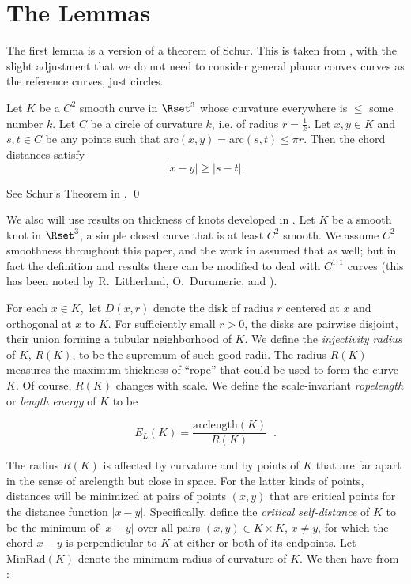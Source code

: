 \documentclass{elsart}
\begin{document}
\section{The Lemmas}
\label{thelemmas}

The first lemma is a version of a theorem of Schur.  This
is taken from \cite{Ch}, with the slight adjustment that
we do not need to consider general planar convex curves as
the reference curves, just circles.
 
\begin{lem}  Let $K$ be a $C^2$ smooth curve in $\Rset^3$
whose curvature everywhere is
$\leq$ some number $k$.  Let $C$ be a circle of curvature
$k$, i.e.{} of radius $r = {\frac1k}$.   Let $x,y \in K$ and $s,t
\in C$ 
be any points
such that $\mathrm{arc}(x,y)=\mathrm{arc}(s,t)
\leq \pi r$.  Then the chord distances satisfy $$|x-y|
\geq |s-t|.  $$
\label{schursthm}
\end{lem}

\begin{pf} See Schur's Theorem in \cite{Ch}.
\qed
\end{pf}

We also will use results on thickness of knots developed
in
\cite{LSDR}.  Let $K$ be a smooth knot in $\Rset^3$, a
simple closed curve that is at least $C^2$ smooth.  We
assume $C^2$ smoothness throughout this paper, and the
work in  \cite{LSDR} assumed that as well; but in fact
the definition and results there can be modified to deal
with $C^{1,1}$ curves (this has been noted by R.~Litherland,
O.~Durumeric, and \cite{maddocks,cksminimum}).

 
For each $x \in K,$ let
$D(x,r)$ denote the  disk of radius $r$ centered at $x$ and
orthogonal at $x$ to $K$.  For sufficiently small $r>0$,
the disks are pairwise disjoint, their union forming a
tubular neighborhood of
$K$.  We define the {\it injectivity radius} of $K$,
$R(K)$, to be the supremum of such good radii. The radius
$R(K)$ measures the maximum thickness of ``rope'' that
could be used to form the curve
$K$.  Of course, $R(K)$ changes with scale.  We define the
scale-invariant {\it ropelength} or {\it length energy}
of $K$ to be
 
$$E_L(K) =\frac {\mathrm{arclength}(K)}{R(K)}\;\;.$$

The radius $R(K)$ is affected by curvature and by points
of $K$ that are far apart in the sense of arclength but
close in space.  For the latter kinds of points,
distances will be minimized at pairs of points $(x,y)$
that are critical points for the distance function
$|x-y|$. Specifically, define the  {\it critical
self-distance} of
$K$  to be the minimum of $|x-y|$ over all pairs
$(x,y) \in K \times K$, $x\not = y$, for which the chord
$x-y$ is perpendicular to $K$ at either or both of its
endpoints.  Let ${\mathrm{MinRad}}(K)$ denote the minimum
radius of curvature of
$K$.  We then have from \cite{LSDR}:
\end{document}

